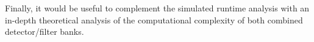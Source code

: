 \documentclass[12pt]{article}
\begin{document}
Finally, it would be useful to complement the simulated runtime analysis with
an in-depth theoretical analysis of the computational complexity of both
combined detector/filter banks. 


%
%

%



\nocite{*}


%

\end{document}

